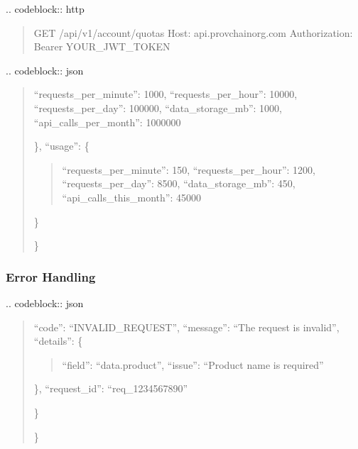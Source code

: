 \documentclass[letterpaper,10pt,english]{sphinxmanual}
\begin{document}
\sphinxAtStartPar
{}
.. code\sphinxhyphen{}block:: http
\begin{quote}

\sphinxAtStartPar
GET /api/v1/account/quotas
Host: api.provchain\sphinxhyphen{}org.com
Authorization: Bearer YOUR\_JWT\_TOKEN
\end{quote}

\sphinxAtStartPar
{}
.. code\sphinxhyphen{}block:: json
\begin{quote}
\begin{description}
\sphinxlineitem{\{}\begin{description}
\sphinxAtStartPar
“requests\_per\_minute”: 1000,
“requests\_per\_hour”: 10000,
“requests\_per\_day”: 100000,
“data\_storage\_mb”: 1000,
“api\_calls\_per\_month”: 1000000

\end{description}

\sphinxAtStartPar
\},
“usage”: \{
\begin{quote}

\sphinxAtStartPar
“requests\_per\_minute”: 150,
“requests\_per\_hour”: 1200,
“requests\_per\_day”: 8500,
“data\_storage\_mb”: 450,
“api\_calls\_this\_month”: 45000
\end{quote}

\sphinxAtStartPar
\}

\end{description}

\sphinxAtStartPar
\}
\end{quote}


\subsubsection{Error Handling}
\label{\detokenize{api/index:error-handling}}
\sphinxAtStartPar
{}
.. code\sphinxhyphen{}block:: json
\begin{quote}
\begin{description}
\sphinxlineitem{\{}\begin{description}
\sphinxAtStartPar
“code”: “INVALID\_REQUEST”,
“message”: “The request is invalid”,
“details”: \{
\begin{quote}

\sphinxAtStartPar
“field”: “data.product”,
“issue”: “Product name is required”
\end{quote}

\sphinxAtStartPar
\},
“request\_id”: “req\_1234567890”

\end{description}

\sphinxAtStartPar
\}

\end{description}

\sphinxAtStartPar
\}
\end{quote}
\end{document}
